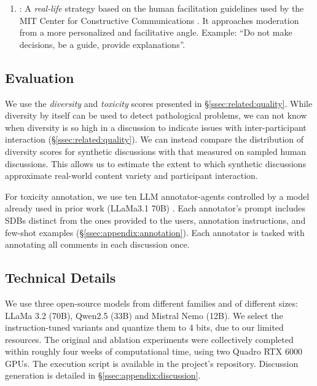 \begin{enumerate}
    \item \textbf{\strategyconstrcomm}: A \emph{real-life} strategy based on the human facilitation guidelines used by the MIT Center for Constructive Communications \cite{dimitra-book}. It approaches moderation from a more personalized and facilitative angle. Example: ``Do not make decisions, be a guide, provide explanations''.
\end{enumerate}


\subsection{Evaluation}
\label{ssec:experimental:evaluation}

 We use the \emph{diversity} and \emph{toxicity} scores presented in \S\ref{ssec:related:quality}. While diversity by itself can be used to detect pathological problems, we can not know when diversity is so high in a discussion to indicate issues with inter-participant interaction (\S\ref{ssec:related:quality}). We can instead compare the distribution of diversity scores for synthetic discussions with that measured on sampled human discussions. This allows us to estimate the extent to which synthetic discussions approximate real-world content variety and participant interaction.
 
 For toxicity annotation, we use ten \ac{LLM} annotator-agents controlled by a model already used in prior work (LLaMa3.1 70B) \cite{kang-qian-2024-implanting}. Each annotator's prompt includes \acp{SDB} distinct from the ones provided to the users, annotation instructions, and few-shot examples (\S\ref{ssec:appendix:annotation}). Each annotator is tasked with annotating all comments in each discussion once.

\subsection{Technical Details}
\label{ssec:experimental:setup}

We use three open-source models from different families and of different sizes: LLaMa 3.2 (70B), Qwen2.5 (33B) and Mistral Nemo (12B). We select the instruction-tuned variants and quantize them to 4 bits, due to our limited resources. The original and ablation experiments were collectively completed within roughly four weeks of computational time, using two Quadro RTX 6000 GPUs. The execution script is available in the project's repository\analysislink. Discussion generation is detailed in \S\ref{ssec:appendix:discussion}.